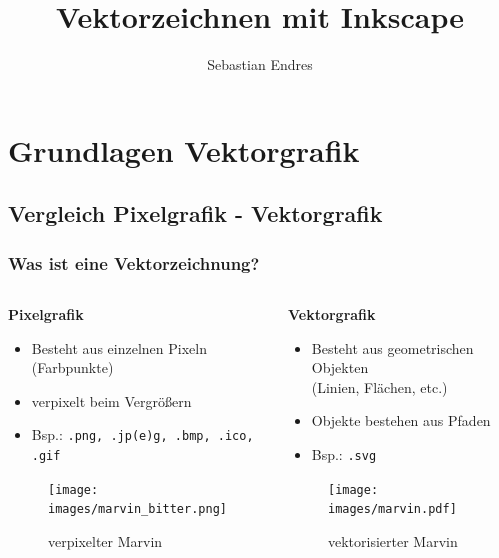 \documentclass[german]{beamer} %
\title{Vektorzeichnen mit Inkscape}
\author{Sebastian Endres}
\newcommand{\images}{vektorzeichnen/}
\begin{document}

\maketitle


\frame{\tableofcontents}


\section{Grundlagen Vektorgrafik}
\subsection{Vergleich Pixelgrafik - Vektorgrafik}
\begin{frame}[t]
  \frametitle{Was ist eine Vektorzeichnung?}
  
  \begin{columns}[t]
  	\begin{column}{0.5\textwidth}
  		\textbf{Pixelgrafik}
  		\begin{itemize}
  			\item Besteht aus einzelnen Pixeln (Farbpunkte)
  			\item verpixelt beim Vergrößern
  			\item Bsp.: \texttt{.png, .jp(e)g, .bmp, .ico, .gif}
  		\end{itemize}
  		\begin{figure}
  		   \centering
  			\texttt{[image: \\images/marvin\_bitter.png]}
  			\caption{verpixelter Marvin}
  			\label{fig:marvin_bitter}
  		\end{figure}
  	\end{column}
  	
  	\begin{column}{0.5\textwidth}
  	\textbf{Vektorgrafik}
  		\begin{itemize}
  			\item Besteht aus geometrischen Objekten \\(Linien, Flächen, etc.)
  			\item Objekte bestehen aus Pfaden
  			\item Bsp.: \texttt{.svg}
  		\end{itemize}
  		\begin{figure}
  			\centering
  			\texttt{[image: \\images/marvin.pdf]}
  			\caption{vektorisierter Marvin}
  			\label{fig:marvin_vektor}
  		\end{figure}
  	\end{column}
  \end{columns}
  
 \end{frame}
\end{document}

